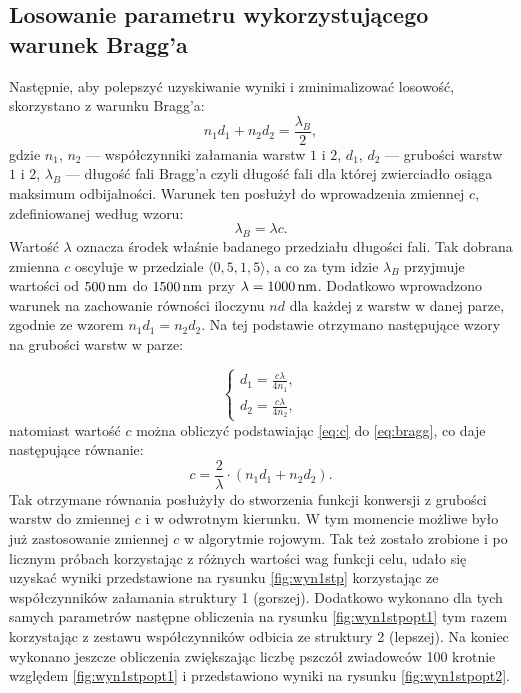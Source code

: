 \subsection{Losowanie parametru wykorzystującego warunek Bragg'a} %
Następnie, aby polepszyć uzyskiwanie wyniki i zminimalizować losowość, skorzystano z warunku Bragg'a:
\begin{equation}
    n_1d_1 + n_2d_2 = \frac{\lambda_B}{2}, \label{eq:bragg}
\end{equation}
gdzie $n_1$, $n_2$ --- współczynniki załamania warstw $1$ i $2$, $d_1$, $d_2$ --- grubości warstw $1$ i $2$, $\lambda_B$ --- długość fali Bragg'a czyli długość fali dla której zwierciadło osiąga maksimum odbijalności. Warunek ten posłużył do wprowadzenia zmiennej $c$, zdefiniowanej według wzoru:
\begin{equation}
    \lambda_B = \lambda c. \label{eq:c}
\end{equation}
Wartość $\lambda$ oznacza środek właśnie badanego przedziału długości fali. Tak dobrana zmienna $c$ oscyluje w przedziale $\langle 0,5, 1,5 \rangle$, a co za tym idzie $\lambda_B$ przyjmuje wartości od $500\,\mathrm{nm}$ do $1500\,\mathrm{nm}$ przy $\lambda = 1000\,\mathrm{nm}$. Dodatkowo wprowadzono warunek na zachowanie równości iloczynu $nd$ dla każdej z warstw w danej parze, zgodnie ze wzorem $n_1d_1=n_2d_2$. Na tej podstawie otrzymano następujące wzory na grubości warstw w parze: 

\begin{equation}
    \left\{ \begin{array}{c}
         d_1 = \frac{c\lambda}{4n_1}, \\ d_2 = \frac{c\lambda}{4n_2},
    \end{array}\right.
\end{equation}
natomiast wartość $c$ można obliczyć podstawiając \ref{eq:c} do \ref{eq:bragg}, co daje następujące równanie:
\begin{equation}
    c = \frac{2}{\lambda} \cdot (n_1d_1 + n_2d_2).
\end{equation}
Tak otrzymane równania posłużyły do stworzenia funkcji konwersji z grubości warstw do zmiennej $c$ i w odwrotnym kierunku. W tym momencie możliwe było już zastosowanie zmiennej $c$ w algorytmie rojowym. Tak też zostało zrobione i po licznym próbach korzystając z różnych wartości wag funkcji celu, udało się uzyskać wyniki przedstawione na rysunku \ref{fig:wyn1stp} korzystając ze współczynników załamania struktury 1 (gorszej). Dodatkowo wykonano dla tych samych parametrów następne obliczenia na rysunku \ref{fig:wyn1stpopt1} tym razem korzystając z zestawu współczynników odbicia ze struktury 2 (lepszej). Na koniec wykonano jeszcze obliczenia zwiększając liczbę pszczół zwiadowców 100 krotnie względem \ref{fig:wyn1stpopt1} i przedstawiono wyniki na rysunku \ref{fig:wyn1stpopt2}.


